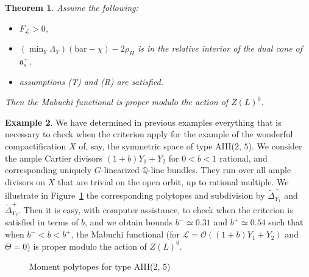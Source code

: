 \documentclass{amsart}
\newtheorem{thm}{Theorem}[section]
\theoremstyle{definition}
\newtheorem{exa}[thm]{Example}
\begin{document}
\begin{thm}
\label{thm_coercivity}
Assume the following: 
\begin{itemize}
\item $F_{\mathcal{L}}>0$, 
\item $(\min_Y \Lambda_Y)(\mathrm{bar}-\chi)-2\rho_H$ 
is in the relative interior of the dual cone of $\mathfrak{a}_s^+$,
\item assumptions (T) and (R) are satisfied.
\end{itemize}
Then the Mabuchi functional is proper modulo the action of 
$Z(L)^0$. 
\end{thm}

\begin{exa}
We have determined in previous examples everything that is necessary 
to check when the criterion apply for the example of the wonderful 
compactification $X$ of, say, the symmetric space of type AIII($2$, $5$).
We consider the ample Cartier divisors $(1+b)Y_1+Y_2$ for 
$0<b<1$ rational, and corresponding uniquely $G$-linearized 
$\mathbb{Q}$-line bundles. They run over all ample divisors on $X$ 
that are trivial on the open orbit, up to rational multiple. 
We illustrate in Figure~\ref{fig_pol_AIII} the corresponding 
polytopes and subdivision by $\tilde{\Delta}^+_{Y_1}$ and 
$\tilde{\Delta}^+_{Y_2}$.
Then it is easy, with computer assistance, to check when the criterion 
is satisfied in terms of $b$, and we obtain bounds $b^-\simeq 0.31$ 
and $b^+\simeq 0.54$ such that when $b^-<b<b^+$, the Mabuchi 
functional (for $\mathcal{L}=\mathcal{O}((1+b)Y_1+Y_2)$ and 
$\Theta=0$) is proper modulo the action of $Z(L)^0$.
\end{exa}

\begin{figure}
\centering
\caption{
Moment polytopes for type AIII($2$, $5$)}
\label{fig_pol_AIII}
\end{figure}
\end{document}
